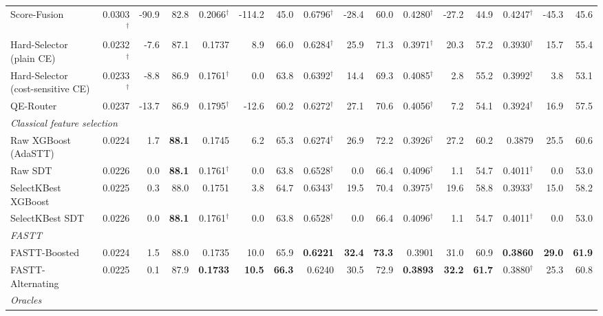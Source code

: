 \begin{table}[t]
\begin{adjustbox}{max width=\linewidth}
\begin{tabular}{lrrrrrrrrrrrrrrr}
        Score-Fusion & 0.0303$^{\dagger}$ & -90.9 & 82.8 & 0.2066$^{\dagger}$ & -114.2 & 45.0 & 0.6796$^{\dagger}$ & -28.4 & 60.0 & 0.4280$^{\dagger}$ & -27.2 & 44.9 & 0.4247$^{\dagger}$ & -45.3 & 45.6 \\
        Hard-Selector (plain CE) & 0.0232$^{\dagger}$ & -7.6 & 87.1 & 0.1737 & 8.9 & 66.0 & 0.6284$^{\dagger}$ & 25.9 & 71.3 & 0.3971$^{\dagger}$ & 20.3 & 57.2 & 0.3930$^{\dagger}$ & 15.7 & 55.4 \\
        Hard-Selector (cost-sensitive CE) & 0.0233$^{\dagger}$ & -8.8 & 86.9 & 0.1761$^{\dagger}$ & 0.0 & 63.8 & 0.6392$^{\dagger}$ & 14.4 & 69.3 & 0.4085$^{\dagger}$ & 2.8 & 55.2 & 0.3992$^{\dagger}$ & 3.8 & 53.1 \\
        QE-Router & 0.0237 & -13.7 & 86.9 & 0.1795$^{\dagger}$ & -12.6 & 60.2 & 0.6272$^{\dagger}$ & 27.1 & 70.6 & 0.4056$^{\dagger}$ & 7.2 & 54.1 & 0.3924$^{\dagger}$ & 16.9 & 57.5 \\
        \midrule \multicolumn{16}{l}{\textit{Classical feature selection}} \\
        Raw XGBoost (AdaSTT) & 0.0224 & 1.7 & \textbf{88.1} & 0.1745 & 6.2 & 65.3 & 0.6274$^{\dagger}$ & 26.9 & 72.2 & 0.3926$^{\dagger}$ & 27.2 & 60.2 & 0.3879 & 25.5 & 60.6 \\
        Raw SDT & 0.0226 & 0.0 & \textbf{88.1} & 0.1761$^{\dagger}$ & 0.0 & 63.8 & 0.6528$^{\dagger}$ & 0.0 & 66.4 & 0.4096$^{\dagger}$ & 1.1 & 54.7 & 0.4011$^{\dagger}$ & 0.0 & 53.0 \\
        SelectKBest XGBoost & 0.0225 & 0.3 & 88.0 & 0.1751 & 3.8 & 64.7 & 0.6343$^{\dagger}$ & 19.5 & 70.4 & 0.3975$^{\dagger}$ & 19.6 & 58.8 & 0.3933$^{\dagger}$ & 15.0 & 58.2 \\
        SelectKBest SDT & 0.0226 & 0.0 & \textbf{88.1} & 0.1761$^{\dagger}$ & 0.0 & 63.8 & 0.6528$^{\dagger}$ & 0.0 & 66.4 & 0.4096$^{\dagger}$ & 1.1 & 54.7 & 0.4011$^{\dagger}$ & 0.0 & 53.0 \\
        \midrule \multicolumn{16}{l}{\textit{FASTT}} \\
        FASTT-Boosted & 0.0224 & 1.5 & 88.0 & 0.1735 & 10.0 & 65.9 & \textbf{0.6221} & \textbf{32.4} & \textbf{73.3} & 0.3901 & 31.0 & 60.9 & \textbf{0.3860} & \textbf{29.0} & \textbf{61.9} \\
        FASTT-Alternating & 0.0225 & 0.1 & 87.9 & \textbf{0.1733} & \textbf{10.5} & \textbf{66.3} & 0.6240 & 30.5 & 72.9 & \textbf{0.3893} & \textbf{32.2} & \textbf{61.7} & 0.3880$^{\dagger}$ & 25.3 & 60.8 \\
        \midrule \multicolumn{16}{l}{\textit{Oracles}} \\

\end{tabular}
\end{adjustbox}
\end{table}
